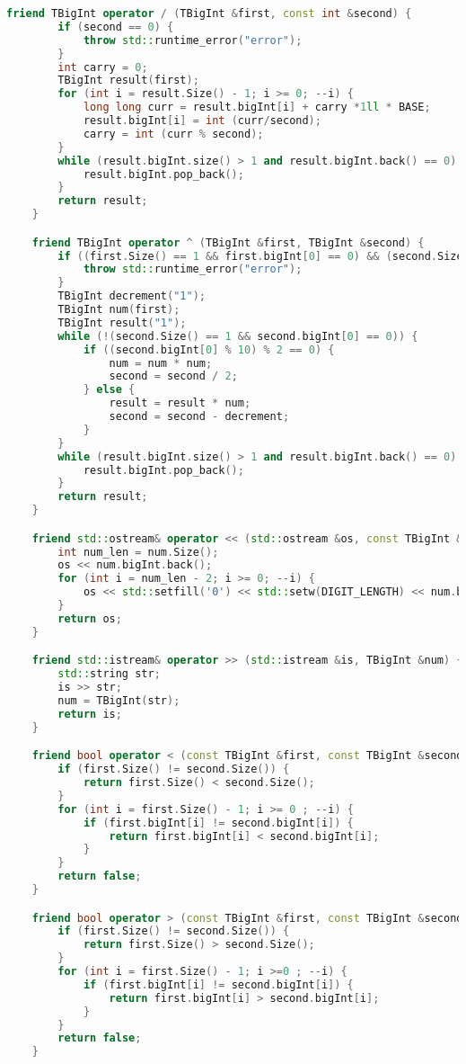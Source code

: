 \begin{lstlisting}[language=C++]
    friend TBigInt operator / (TBigInt &first, const int &second) {
        if (second == 0) {
            throw std::runtime_error("error");
        }
        int carry = 0;
        TBigInt result(first);
        for (int i = result.Size() - 1; i >= 0; --i) {
            long long curr = result.bigInt[i] + carry *1ll * BASE;
            result.bigInt[i] = int (curr/second);
            carry = int (curr % second);
        }
        while (result.bigInt.size() > 1 and result.bigInt.back() == 0) {
            result.bigInt.pop_back();
        }
        return result;
    }

    friend TBigInt operator ^ (TBigInt &first, TBigInt &second) {
        if ((first.Size() == 1 && first.bigInt[0] == 0) && (second.Size() == 1 && second.bigInt[0] == 0)) {
            throw std::runtime_error("error");
        }
        TBigInt decrement("1");
        TBigInt num(first);
        TBigInt result("1");
        while (!(second.Size() == 1 && second.bigInt[0] == 0)) {
            if ((second.bigInt[0] % 10) % 2 == 0) {
                num = num * num;
                second = second / 2;
            } else {
                result = result * num;
                second = second - decrement;
            }
        }
        while (result.bigInt.size() > 1 and result.bigInt.back() == 0) {
            result.bigInt.pop_back();
        }
        return result;
    }

    friend std::ostream& operator << (std::ostream &os, const TBigInt &num) {
        int num_len = num.Size();
        os << num.bigInt.back();
        for (int i = num_len - 2; i >= 0; --i) {
            os << std::setfill('0') << std::setw(DIGIT_LENGTH) << num.bigInt[i];
        }
        return os;
    }

    friend std::istream& operator >> (std::istream &is, TBigInt &num) {
        std::string str;
        is >> str;
        num = TBigInt(str);
        return is;
    }

    friend bool operator < (const TBigInt &first, const TBigInt &second) {
        if (first.Size() != second.Size()) {
            return first.Size() < second.Size();
        }
        for (int i = first.Size() - 1; i >= 0 ; --i) {
            if (first.bigInt[i] != second.bigInt[i]) {
                return first.bigInt[i] < second.bigInt[i];
            }
        }
        return false;
    }

    friend bool operator > (const TBigInt &first, const TBigInt &second) {
        if (first.Size() != second.Size()) {
            return first.Size() > second.Size();
        }
        for (int i = first.Size() - 1; i >=0 ; --i) {
            if (first.bigInt[i] != second.bigInt[i]) {
                return first.bigInt[i] > second.bigInt[i];
            }
        }
        return false;
    }


\end{lstlisting}
